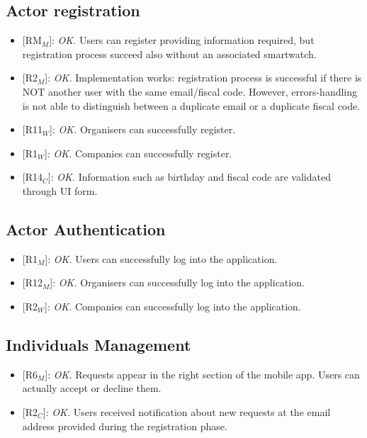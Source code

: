 \documentclass{article}
\begin{document}
\subsection{Actor registration}
\begin{itemize}
	\item {[RM$_M$]}: \textit{OK.} Users can register providing information required, but registration process succeed also without an associated smartwatch.
	\item {[R2$_M$]}: \textit{OK.} Implementation works: registration process is successful if  there is NOT another user with the same email/fiscal code. However, errors-handling is not able to distinguish between a duplicate email or a duplicate fiscal code.
	\item {[R11$_W$]}: \textit{OK.} Organisers can successfully register.
	\item {[R1$_W$]}: \textit{OK.} Companies can successfully register.
	\item {[R14$_C$]}: \textit{OK.} Information such as birthday and fiscal code are validated through UI form.
\end{itemize}

\subsection{Actor Authentication} 
\begin{itemize}
	\item {[R1$_M$]}: \textit{OK.} Users can successfully log into the application.
	\item {[R12$_M$]}: \textit{OK.} Organisers can successfully log into the application.
	\item {[R2$_W$]}: \textit{OK.} Companies  can successfully log into the application.
\end{itemize}

\subsection{Individuals Management}
\begin{itemize}
	\item {[R6$_M$]}: \textit{OK.} Requests appear in the right section of the mobile app. Users can actually accept or decline them.
	\item {[R2$_C$]}: \textit{OK.} Users received notification about new requests at the email address provided during the registration phase.
\end{itemize}
\end{document}
